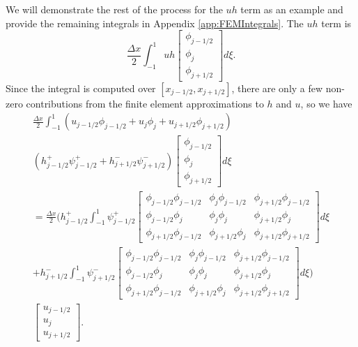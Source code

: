 We will demonstrate the rest of the process for the $uh$ term as an example and provide the remaining integrals in Appendix \ref{app:FEMIntegrals}. The $uh$ term is 
\begin{equation*}
\frac{\Delta x}{2}\int_{-1 }^{1}  uh \begin{bmatrix}
\phi_{j-1/2}\\\phi_j \\\phi_{j+1/2}
\end{bmatrix} d\xi.
\end{equation*}
Since the integral is computed over $\left[x_{j-1/2},x_{j+1/2}\right]$, there are only a few non-zero contributions from the finite element approximations to $h$ and $u$, so we have
\begin{multline*}
\frac{\Delta x}{2}\int_{-1 }^{1}  \left(u_{j-1/2}\phi_{j-1/2} + u_{j}\phi_{j} + u_{j+1/2}\phi_{j+1/2}\right) \\\left(h^+_{j-1/2}\psi^+_{j-1/2}  + h^-_{j+1/2}\psi^-_{j+1/2}\right) \begin{bmatrix}
\phi_{j-1/2}\\\phi_j \\\phi_{j+1/2}
\end{bmatrix} d\xi\\
=\frac{\Delta x}{2}\Bigg( h^+_{j-1/2} \int_{-1 }^{1} \psi^+_{j-1/2}  \begin{bmatrix}
\phi_{j-1/2} \phi_{j-1/2} & \phi_{j}  \phi_{j-1/2}  & \phi_{j+1/2} \phi_{j-1/2}\\\phi_{j-1/2} \phi_{j} & \phi_{j} \phi_{j} &  \phi_{j + 1/2} \phi_{j}\\\phi_{j+1/2} \phi_{j-1/2} &  \phi_{j+1/2} \phi_{j} & \phi_{j+1/2} \phi_{j+1/2}
\end{bmatrix} d\xi  \\ +  h^-_{j+1/2}\int_{-1 }^{1} \psi^-_{j+1/2} \begin{bmatrix}
\phi_{j-1/2} \phi_{j-1/2} & \phi_{j}  \phi_{j-1/2}  & \phi_{j+1/2} \phi_{j-1/2}\\\phi_{j-1/2} \phi_{j} & \phi_{j} \phi_{j} &  \phi_{j + 1/2} \phi_{j}\\\phi_{j+1/2} \phi_{j-1/2} &  \phi_{j+1/2} \phi_{j} & \phi_{j+1/2} \phi_{j+1/2}
\end{bmatrix} d\xi \Bigg) \\  \begin{bmatrix}
u_{j-1/2}\\u_j \\u _{j+1/2}
\end{bmatrix}.
\end{multline*}


